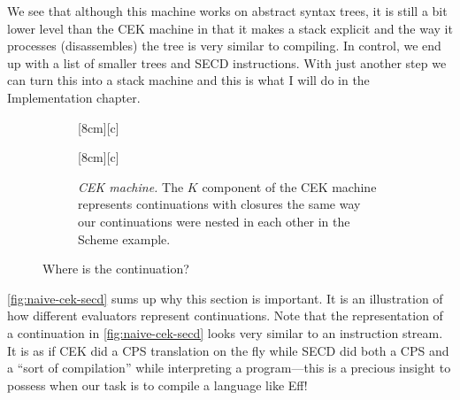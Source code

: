 \documentclass[class=article, crop=false]{standalone}
\begin{document}
We see that although this machine works on abstract syntax trees, it is still a
bit lower level than the CEK machine in that it makes a stack explicit and the
way it processes (disassembles) the tree is very similar to compiling. In
control, we end up with a list of smaller trees and SECD instructions. With 
just another step we can turn this into a stack machine and this is what I will
do in the Implementation chapter. 
%
%
\begin{figure}[t]
  \begin{subfigure}{.5\textwidth}
    [8cm][c]
    {}
    \label{fig:continuation-naive}
  \end{subfigure}
  \begin{subfigure}{.5\textwidth}
    [8cm][c]
    {}
    \label{fig:continuation-secd}
  \end{subfigure}
  \begin{subfigure}{\textwidth}
    \centering
    \caption{\emph{CEK machine.} The $K$ component of the CEK machine represents
    continuations with closures the same way our continuations were nested in each other in the
    Scheme example.}
    \label{fig:continuation-cek}
  \end{subfigure}
  \caption{Where is the continuation?}
  \label{fig:naive-cek-secd}
\end{figure}
%
\autoref{fig:naive-cek-secd} sums up why this section is important. It is an
illustration of how different evaluators represent continuations. Note that the
representation of a continuation in \autoref{fig:naive-cek-secd} looks
very similar to an instruction stream. It is as if CEK did a CPS translation on
the fly while SECD did both a CPS and a ``sort of compilation'' while
interpreting a program---this is a precious insight to possess when our task is to
compile a language like Eff!
\end{document}
